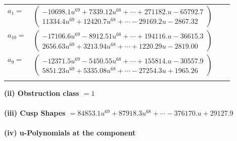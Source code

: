 \documentclass[1p]{elsarticle_modified}
\theoremstyle{definition}
\begin{document}
\begin{tabular}{m{7pt} m{180pt} m{7pt} m{180pt} }
\flushright $a_{1}=$&$\begin{pmatrix}-10698.1 u^{69}+7339.12 u^{68}+\cdots+271182. u-65792.7\\11334.4 u^{69}+12420.7 u^{68}+\cdots-29169.2 u-2867.32\end{pmatrix}$ \\
\flushright $a_{10}=$&$\begin{pmatrix}-17106.6 u^{69}-8912.51 u^{68}+\cdots+194116. u-36615.3\\2656.63 u^{69}+3213.94 u^{68}+\cdots+1220.29 u-2819.00\end{pmatrix}$ \\
\flushright $a_{9}=$&$\begin{pmatrix}-12371.5 u^{69}-5450.55 u^{68}+\cdots+155814. u-30557.9\\5851.23 u^{69}+5335.08 u^{68}+\cdots-27254.3 u+1965.26\end{pmatrix}$\\&\end{tabular}
\flushleft \textbf{(ii) Obstruction class $= 1$}\\~\\
\flushleft \textbf{(iii) Cusp Shapes $= 84853.1 u^{69}+87918.3 u^{68}+\cdots-376170. u+29127.9$}\\~\\
\newpage\renewcommand{\arraystretch}{1}
\flushleft \textbf{(iv) u-Polynomials at the component}\newline \\
\end{document}
